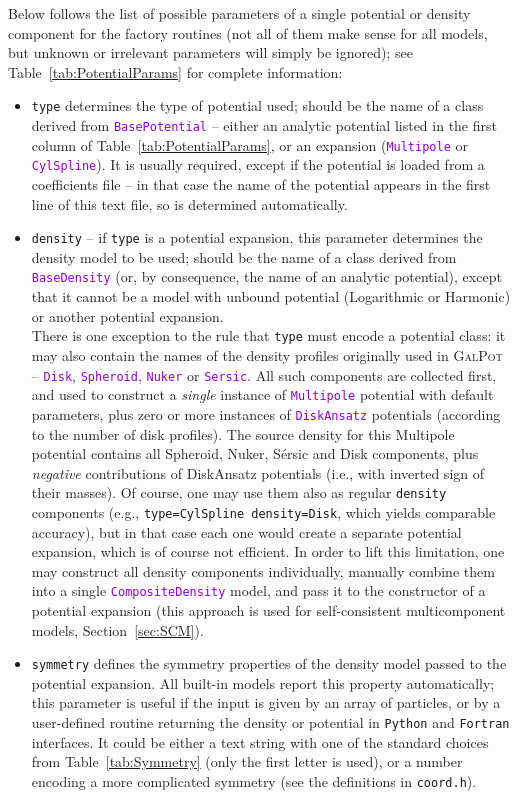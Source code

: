 \documentclass[12pt]{article}
\newcommand{\Python}{\texttt{Python}\xspace}
\newcommand{\Fortran}{\texttt{Fortran}\xspace}
\newcommand{\ttt}[1]{\textcolor{darkviolet}{\texttt{#1}}}
\newcommand{\ppp}[1]{\textcolor{darkolive} {\texttt{#1}}}
\begin{document}
Below follows the list of possible parameters of a single potential or density component for the factory routines (not all of them make sense for all models, but unknown or irrelevant parameters will simply be ignored); see Table~\ref{tab:PotentialParams} for complete information:
\begin{itemize}
\item \ppp{type}  determines the type of potential used; should be the name of a class derived from \ttt{BasePotential} -- either an analytic potential listed in the first column of Table~\ref{tab:PotentialParams}, or an expansion (\ttt{Multipole} or \ttt{CylSpline}). It is usually required, except if the potential is loaded from a coefficients file -- in that case the name of the potential appears in the first line of this text file, so is determined automatically.
\item  \ppp{density} -- if \ppp{type} is a potential expansion, this parameter determines the density model to be used; should be the name of a class derived from \ttt{BaseDensity} (or, by consequence, the name of an analytic potential), except that it cannot be a model with unbound potential (Logarithmic or Harmonic) or another potential expansion.\\
\label{sec:PotentialGalpot}%
There is one exception to the rule that \ppp{type} must encode a potential class: it may also contain the names of the density profiles originally used in \textsc{GalPot} -- \ttt{Disk}, \ttt{Spheroid}, \ttt{Nuker} or \ttt{Sersic}. All such components are collected first, and used to construct a \textit{single} instance of \ttt{Multipole} potential with default parameters, plus zero or more instances of \ttt{DiskAnsatz} potentials (according to the number of disk profiles). The source density for this Multipole potential contains all Spheroid, Nuker, S\'ersic and Disk components, plus \textit{negative} contributions of DiskAnsatz potentials (i.e., with inverted sign of their masses). Of course, one may use them also as regular \ppp{density} components (e.g., \ppp{type=CylSpline density=Disk}, which yields comparable accuracy), but in that case each one would create a separate potential expansion, which is of course not efficient. In order to lift this limitation, one may construct all density components individually, manually combine them into a single \ttt{CompositeDensity} model, and pass it to the constructor of a potential expansion (this approach is used for self-consistent multicomponent models, Section~\ref{sec:SCM}).
\item \ppp{symmetry}  defines the symmetry properties of the density model passed to the potential expansion. All built-in models report this property automatically; this parameter is useful if the input is given by an array of particles, or by a user-defined routine returning the density or potential in \Python and \Fortran interfaces. It could be either a text string with one of the standard choices from Table~\ref{tab:Symmetry} (only the first letter is used), or a number encoding a more complicated symmetry (see the definitions in \texttt{coord.h}).

\end{itemize}
\end{document}
